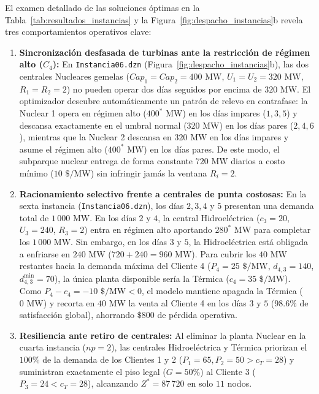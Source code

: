 El examen detallado de las soluciones óptimas en la Tabla~\ref{tab:resultados_instancias} y la Figura~\ref{fig:despacho_instancias}b revela tres comportamientos operativos clave:
\begin{enumerate}
    \item \textbf{Sincronización desfasada de turbinas ante la restricción de régimen alto ($C_4$):} En \texttt{Instancia06.dzn} (Figura~\ref{fig:despacho_instancias}b), las dos centrales Nucleares gemelas ($Cap_1=Cap_2=400\text{ MW}$, $U_1=U_2=320\text{ MW}$, $R_1=R_2=2$) no pueden operar dos días seguidos por encima de $320\text{ MW}$. El optimizador descubre automáticamente un patrón de relevo en contrafase: la Nuclear 1 opera en régimen alto ($400^*\text{ MW}$) en los días impares ($1, 3, 5$) y descansa exactamente en el umbral normal ($320\text{ MW}$) en los días pares ($2, 4, 6$), mientras que la Nuclear 2 descansa en $320\text{ MW}$ en los días impares y asume el régimen alto ($400^*\text{ MW}$) en los días pares. De este modo, el subparque nuclear entrega de forma constante $720\text{ MW}$ diarios a costo mínimo ($10\text{ \$/MW}$) sin infringir jamás la ventana $R_i = 2$.
    \item \textbf{Racionamiento selectivo frente a centrales de punta costosas:} En la sexta instancia (\texttt{Instancia06.dzn}), los días $2, 3, 4$ y $5$ presentan una demanda total de $1\,000\text{ MW}$. En los días $2$ y $4$, la central Hidroeléctrica ($c_3=20$, $U_3=240$, $R_3=2$) entra en régimen alto aportando $280^*\text{ MW}$ para completar los $1\,000\text{ MW}$. Sin embargo, en los días $3$ y $5$, la Hidroeléctrica está obligada a enfriarse en $240\text{ MW}$ ($720 + 240 = 960\text{ MW}$). Para cubrir los $40\text{ MW}$ restantes hacia la demanda máxima del Cliente 4 ($P_4 = 25\text{ \$/MW}$, $d_{4,3}=140$, $d^{\min}_{4,3}=70$), la única planta disponible sería la Térmica ($c_4 = 35\text{ \$/MW}$). Como $P_4 - c_4 = -10\text{ \$/MW} < 0$, el modelo mantiene apagada la Térmica ($0\text{ MW}$) y recorta en $40\text{ MW}$ la venta al Cliente 4 en los días $3$ y $5$ ($98.6\%$ de satisfacción global), ahorrando $\$800$ de pérdida operativa.
    \item \textbf{Resiliencia ante retiro de centrales:} Al eliminar la planta Nuclear en la cuarta instancia ($np=2$), las centrales Hidroeléctrica y Térmica priorizan el $100\%$ de la demanda de los Clientes 1 y 2 ($P_1=65, P_2=50 > c_T=28$) y suministran exactamente el piso legal ($G=50\%$) al Cliente 3 ($P_3=24 < c_T=28$), alcanzando $Z^* = 87\,720$ en solo $11$ nodos.
\end{enumerate}

